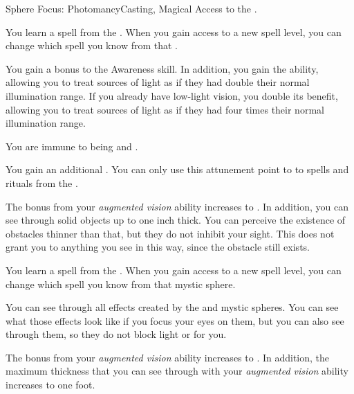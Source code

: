     \begin{feat}{Sphere Focus: Photomancy}{Casting, Magical}
        \featpre Access to the  .

         You learn a spell from the  .
        When you gain access to a new spell level, you can change which spell you know from that .

         You gain a  bonus to the Awareness skill.
        In addition, you gain the  ability, allowing you to treat sources of light as if they had double their normal illumination range.
        If you already have low-light vision, you double its benefit, allowing you to treat sources of light as if they had four times their normal illumination range.

         You are immune to being \dazzled and \blinded.

         You gain an additional .
        You can only use this attunement point to  to spells and rituals from the  .

         The bonus from your \textit{augmented vision} ability increases to .
        In addition, you can see through solid objects up to one inch thick.
        You can perceive the existence of obstacles thinner than that, but they do not inhibit your sight.
        This does not grant you  to anything you see in this way, since the obstacle still exists.

         You learn a spell from the  .
        When you gain access to a new spell level, you can change which spell you know from that mystic sphere.

         You can see through all effects created by the  and  mystic spheres.
        You can see what those effects look like if you focus your eyes on them, but you can also see through them, so they do not block light or  for you.

         The bonus from your \textit{augmented vision} ability increases to .
        In addition, the maximum thickness that you can see through with your \textit{augmented vision} ability increases to one foot.
    \end{feat}

